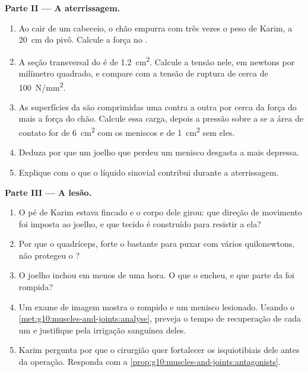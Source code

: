 \begin{problem}
\medskip
\noindent\textbf{Parte II --- A aterrissagem.}
\begin{enumerate}[resume]
  \item Ao cair de um cabeceio, o chão empurra com três vezes o peso de
        Karim, a \qty{20}{cm} do pivô. Calcule a força no .
  \item A seção transversal do  é de \qty{1.2}{cm^2}. Calcule a
        tensão nele, em newtons por milímetro quadrado, e compare com a
        tensão de ruptura de cerca de \qty{100}{N/mm^2}.
  \item As superfícies da  são comprimidas uma contra a
        outra por cerca da força do  mais a força do chão.
        Calcule essa carga, depois a pressão sobre a  se a
        área de contato for de \qty{6}{cm^2} com os meniscos e de
        \qty{1}{cm^2} sem eles.
  \item Deduza por que um joelho que perdeu um menisco desgasta a
         mais depressa.
  \item Explique com o que o líquido sinovial contribui durante a
        aterrissagem.
\end{enumerate}

\medskip
\noindent\textbf{Parte III --- A lesão.}
\begin{enumerate}[resume]
  \item O pé de Karim estava fincado e o corpo dele girou: que direção
        de movimento foi imposta ao joelho, e que tecido é construído
        para resistir a ela?
  \item Por que o quadríceps, forte o bastante para puxar com vários
        quilonewtons, não protegeu o ?
  \item O joelho inchou em menos de uma hora. O que o encheu, e que
        parte da  foi rompida?
  \item Um exame de imagem mostra o  rompido e um menisco
        lesionado. Usando o
        \cref{met:g10:muscles-and-joints:analyse}, preveja o tempo de
        recuperação de cada um e justifique pela irrigação sanguínea
        deles.
  \item Karim pergunta por que o cirurgião quer fortalecer os
        isquiotibiais dele antes da operação. Responda com a
        \cref{prop:g10:muscles-and-joints:antagonists}.
\end{enumerate}


\end{problem}
